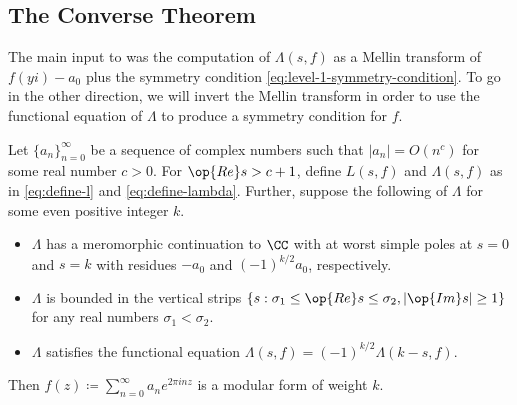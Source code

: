 \documentclass{amsart}
\begin{document}
\subsection{The Converse Theorem}
The main input to  was the computation of $\Lambda(s,f)$ as a Mellin transform of $f(yi)-a_0$ plus the symmetry condition \eqref{eq:level-1-symmetry-condition}. To go in the other direction, we will invert the Mellin transform in order to use the functional equation of $\Lambda$ to produce a symmetry condition for $f$.
\begin{theorem}[Hecke] \label{thm:hecke}
	Let $\{a_n\}_{n=0}^\infty$ be a sequence of complex numbers such that $|a_n|=O\left(n^c\right)$ for some real number $c>0$. For $\op{Re}s>c+1$, define $L(s,f)$ and $\Lambda(s,f)$ as in \eqref{eq:define-l} and \eqref{eq:define-lambda}. Further, suppose the following of $\Lambda$ for some even positive integer $k$.
	\begin{itemize}
		\item $\Lambda$ has a meromorphic continuation to $\CC$ with at worst simple poles at $s=0$ and $s=k$ with residues $-a_0$ and $(-1)^{k/2}a_0$, respectively.
		\item $\Lambda$ is bounded in the vertical strips $\{s:\sigma_1\le\op{Re}s\le\sigma_2,\left|\op{Im}s\right|\ge1\}$ for any real numbers $\sigma_1<\sigma_2$.
		\item $\Lambda$ satisfies the functional equation $\Lambda(s,f)=(-1)^{k/2}\Lambda(k-s,f)$.
	\end{itemize}
	Then $f(z)\coloneqq\sum_{n=0}^\infty a_ne^{2\pi inz}$ is a modular form of weight $k$.
\end{theorem}
\end{document}
